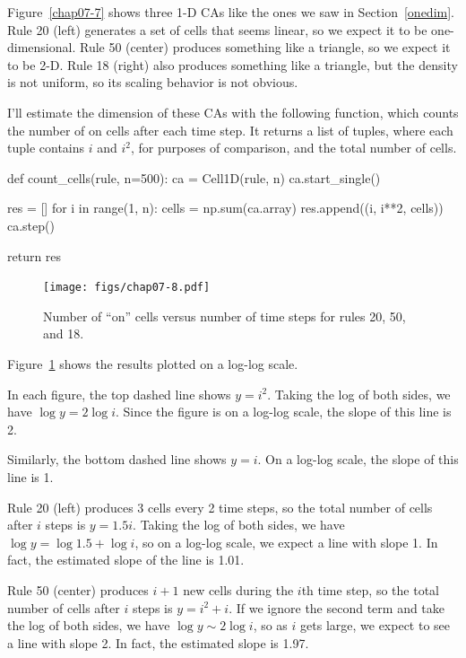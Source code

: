\documentclass[12pt]{book}
\theoremstyle{exercise}
\begin{document}
Figure~\ref{chap07-7} shows three 1-D CAs like the ones we saw
in Section~\ref{onedim}.  Rule 20 (left) generates
a set of cells that seems linear, so we expect it to be one-dimensional.  Rule 50 (center) produces something like a triangle, so
we expect it to be 2-D.  Rule 18 (right) also produces something like a
triangle, but the density is not uniform, so its scaling behavior is
not obvious.

I'll estimate the dimension of these CAs with the following function,
which counts the number of on cells after each time step.
It returns a list of tuples, where each tuple contains $i$ and
$i^2$, for purposes of comparison, and the total number of cells.

\begin{code}
def count_cells(rule, n=500):
    ca = Cell1D(rule, n)
    ca.start_single()
    
    res = []
    for i in range(1, n):
        cells = np.sum(ca.array)
        res.append((i, i**2, cells))
        ca.step()
        
    return res
\end{code}

\begin{figure}
\centerline{\texttt{[image: figs/chap07-8.pdf]}}
\caption{Number of ``on'' cells versus number of time steps for
rules 20, 50, and 18.}
\label{chap07-8}
\end{figure}

Figure~\ref{chap07-8} shows the results plotted on a log-log scale.

In each figure, the top dashed line shows $y = i^2$.  Taking
the log of both sides, we have $\log y = 2 \log i$.  Since the
figure is on a log-log scale, the slope of this line is 2.

Similarly, the bottom dashed line shows $y = i$.  On a log-log
scale, the slope of this line is 1.

Rule 20 (left) produces 3 cells every 2 time steps, so the total number
of cells after $i$ steps is $y = 1.5 i$.  Taking the log of both
sides, we have $\log y = \log 1.5 + \log i$, so on a log-log
scale, we expect a line with slope 1.  In fact, the estimated
slope of the line is 1.01.

Rule 50 (center) produces $i+1$ new cells during the $i$th time step,
so the total number of cells after $i$ steps is $y = i^2 + i$.  If we
ignore the second term and take the log of both sides, we have $\log y
\sim 2 \log i$, so as $i$ gets large, we expect to see a line with
slope 2.  In fact, the estimated slope is 1.97.
\end{document}
